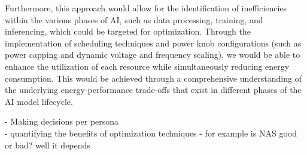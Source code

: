 Furthermore, this approach would allow for the identification of inefficiencies within the various phases of AI, such as data processing, training, and inferencing, which could be targeted for optimization. Through the implementation of scheduling techniques and power knob configurations (such as power capping and dynamic voltage and frequency scaling), we would be able to enhance the utilization of each resource while simultaneously reducing energy consumption. This would be achieved through a comprehensive understanding of the underlying energy-performance trade-offs that exist in different phases of the AI model lifecycle.

- Making decisions per persona \\

- quantifying the benefits of optimization techniques - for example is NAS good or bad? well it depends \\ 



